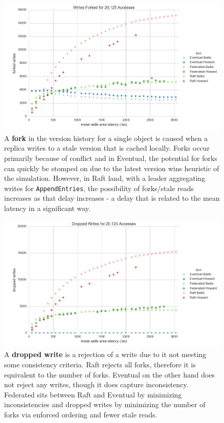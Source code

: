 \documentclass[11pt,letterpaper]{article}
\begin{document}
\begin{figure}[!h]
    \centering
        \includegraphics[width=\textwidth]{figures/forked_writes.png}
        \caption{\textsf{A \textbf{fork} in the version history for a single object is caused when a replica writes to a stale version that is cached locally. Forks occur primarily because of conflict and in Eventual, the potential for forks can quickly be stomped on due to the latest version wins heuristic of the simulation. However, in Raft land, with a leader aggregating writes for \texttt{AppendEntries}, the possibility of forks/stale reads increases as that delay increases - a delay that is related to the mean latency in a significant way.}}
        \label{fig:forked_writes}
\end{figure}


\begin{figure}[!h]
    \centering
        \includegraphics[width=\textwidth]{figures/dropped_writes.png}
        \caption{\textsf{A \textbf{dropped write} is a rejection of a write due to it not meeting some consistency criteria. Raft rejects all forks, therefore it is equivalent to the number of forks. Eventual on the other hand does not reject any writes, though it does capture inconsistency. Federated sits between Raft and Eventual by minimizing inconsistencies and dropped writes by minimizing the number of forks via enforced ordering and fewer stale reads.}}
        \label{fig:dropped_writes}
\end{figure}
\end{document}
